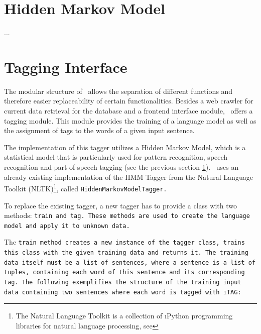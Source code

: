\section{Hidden Markov Model}\label{c.alex.hmm}
...

\section{Tagging Interface}\label{c.alex.tagging}
The modular structure of \Alex\ allows the separation of different functions and therefore easier replaceability of certain functionalities. Besides a web crawler for current data retrieval for the database and a frontend interface module, \Alex\ offers a tagging module. This module provides the training of a language model as well as the assignment of tags to the words of a given input sentence.

The implementation of this tagger utilizes a Hidden Markov Model, which is a statistical model that is particularly used for pattern recognition, speech recognition and part-of-speech tagging (see the previous section \ref{c.alex.hmm}). \Alex\ uses an already existing implementation of the HMM Tagger from the Natural Language Toolkit (NLTK)\footnote{The Natural Language Toolkit is a collection of \i{Python} programming libraries for natural language processing, see }, called \tt{HiddenMarkovModelTagger}.

To replace the existing tagger, a new tagger has to provide a class with two methods: \tt{train} and \tt{tag}. These methods are used to create the language model and apply it to unknown data.

The \tt{train} method creates a new instance of the tagger class, trains this class with the given training data and returns it. The training data itself must be a list of sentences, where a sentence is a list of tuples, containing each word of this sentence and its corresponding tag. The following exemplifies the structure of the training input data containing two sentences where each word is tagged with \i{TAG}:



